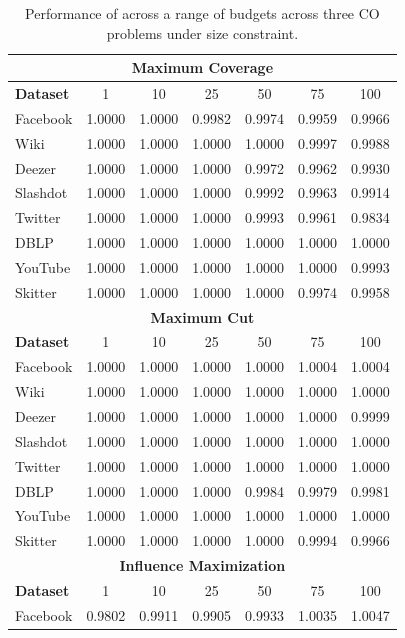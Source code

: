 \begin{table}[h!]
\centering
\caption{Performance of \llm across a range of budgets across three CO problems under size constraint.}
\label{tab:multibudget_size}
\begin{tabular}{lcccccc}
\toprule
\multicolumn{7}{c}{\textbf{Maximum Coverage}} \\
\midrule
\textbf{Dataset} & 1 & 10 & 25 & 50 & 75 & 100 \\
\midrule
Facebook & 1.0000 & 1.0000 & 0.9982 & 0.9974 & 0.9959 & 0.9966 \\
Wiki & 1.0000 & 1.0000 & 1.0000 & 1.0000 & 0.9997 & 0.9988 \\
Deezer & 1.0000 & 1.0000 & 1.0000 & 0.9972 & 0.9962 & 0.9930 \\
Slashdot & 1.0000 & 1.0000 & 1.0000 & 0.9992 & 0.9963 & 0.9914 \\
Twitter & 1.0000 & 1.0000 & 1.0000 & 0.9993 & 0.9961 & 0.9834 \\
DBLP & 1.0000 & 1.0000 & 1.0000 & 1.0000 & 1.0000 & 1.0000 \\
YouTube & 1.0000 & 1.0000 & 1.0000 & 1.0000 & 1.0000 & 0.9993 \\
Skitter & 1.0000 & 1.0000 & 1.0000 & 1.0000 & 0.9974 & 0.9958 \\
\midrule
\multicolumn{7}{c}{\textbf{Maximum Cut}} \\
\midrule
\textbf{Dataset} & 1 & 10 & 25 & 50 & 75 & 100 \\
\midrule
Facebook & 1.0000 & 1.0000 & 1.0000 & 1.0000 & 1.0004 & 1.0004 \\
Wiki & 1.0000 & 1.0000 & 1.0000 & 1.0000 & 1.0000 & 1.0000 \\
Deezer & 1.0000 & 1.0000 & 1.0000 & 1.0000 & 1.0000 & 0.9999 \\
Slashdot & 1.0000 & 1.0000 & 1.0000 & 1.0000 & 1.0000 & 1.0000 \\
Twitter & 1.0000 & 1.0000 & 1.0000 & 1.0000 & 1.0000 & 1.0000 \\
DBLP & 1.0000 & 1.0000 & 1.0000 & 0.9984 & 0.9979 & 0.9981 \\
YouTube & 1.0000 & 1.0000 & 1.0000 & 1.0000 & 1.0000 & 1.0000 \\
Skitter & 1.0000 & 1.0000 & 1.0000 & 1.0000 & 0.9994 & 0.9966 \\
\midrule
\multicolumn{7}{c}{\textbf{Influence Maximization}} \\
\midrule
\textbf{Dataset} & 1 & 10 & 25 & 50 & 75 & 100 \\
\midrule
Facebook & 0.9802 & 0.9911 & 0.9905 & 0.9933 & 1.0035 & 1.0047 \\

\end{tabular}
\end{table}
